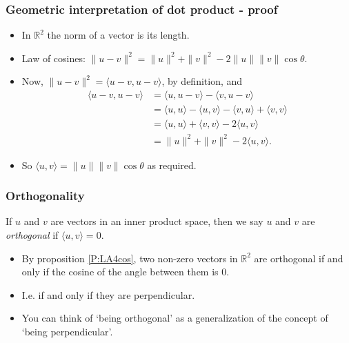 \documentclass[handout]{beamer}
\newcommand{\bR}{\mathbb{R}}
\begin{document}
\begin{frame}
\frametitle{Geometric interpretation of dot product - proof}
\center {} 
\begin{itemize}
\item In $\bR^2$ the norm of a vector is its length.
\item Law of cosines: $\|u-v\|^2 = \|u\|^2+\|v\|^2 - 2\|u\|\|v\|\cos \theta.$ 

\item Now, $\|u-v\|^2 = \langle u-v, u-v\rangle$, by definition, and
\begin{align*}\langle u-v, u-v\rangle &= \langle u, u-v\rangle - \langle v, u - v \rangle\\
&= \langle u, u \rangle -\langle u , v \rangle - \langle v , u \rangle + \langle v, v \rangle\\
&= \langle u, u \rangle + \langle v, v \rangle - 2\langle u, v \rangle\\
&= \|u\|^2+\|v\|^2 - 2\langle u, v \rangle .\end{align*}

\item So $\langle u, v \rangle = \|u\|\|v\|\cos \theta$ as required. 
\end{itemize}

\end{frame}

\begin{frame}
\frametitle{Orthogonality}
\begin{definition}
If $u$ and $v$ are vectors in an inner product space, then we say $u$ and $v$ are \emph{orthogonal} if $\langle u ,v\rangle =0$.
\end{definition}
\vspace{0.5cm}
\begin{itemize}
\item By proposition \ref{P:LA4cos}, two non-zero vectors in $\bR^2$ are orthogonal if and only if the cosine of the angle between them is 0. \vspace{0.5cm}
\item I.e. if and only if they are perpendicular. \vspace{0.5cm}
\item You can think of `being orthogonal' as a generalization of the concept of `being perpendicular'.
\end{itemize}
\end{frame}
\end{document}

